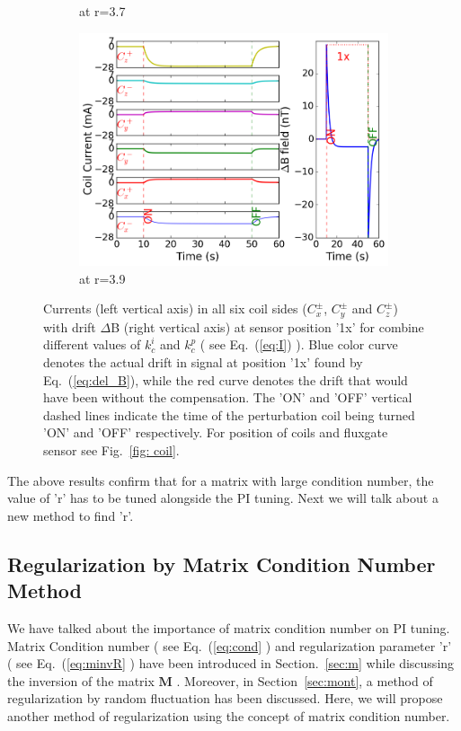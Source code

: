 \begin{figure}[!htb]
\begin{subfigure}{.5\linewidth}
        \caption{at r=3.7}
        \label{fig:r37}
    \end{subfigure}%
        \begin{subfigure}{.5\linewidth}
        \centering
        \includegraphics[width=\linewidth, height= 6.5 cm]{Images/r39}
        \caption{at r=3.9}
        \label{fig:r39}
    \end{subfigure}


    \caption{Currents (left vertical axis) in all six coil sides ($C_x^\pm$, $C_y^\pm$ and $C_z^\pm$) with drift $\Delta$B (right vertical axis) at sensor position '1x' for combine different values of $k_c^i$ and $k_c^p$ ( see Eq.~(\ref{eq:I}) ). Blue color curve denotes the actual drift in signal at position '1x' found by Eq.~(\ref{eq:del_B}), while the red curve denotes the drift that would have been without the compensation. The 'ON' and 'OFF' vertical dashed lines indicate the time of the perturbation coil being turned 'ON' and 'OFF' respectively. For position of coils and fluxgate sensor see Fig.~\ref{fig: coil}.}
    \label{fig:r_pi_more}
\end{figure}

\FloatBarrier

The above results confirm that for a matrix with large condition number, the value of 'r' has to be tuned alongside the PI tuning. Next we will talk about a new method to find 'r'.

\subsection{Regularization by Matrix Condition Number Method  }\label{sec:cond}
We have talked about the importance of matrix condition number on PI tuning. Matrix Condition number ( see Eq.~(\ref{eq:cond} ) and regularization parameter 'r' ( see Eq.~(\ref{eq:minvR} ) have been introduced in Section.~\ref{sec:m} while discussing the inversion of the matrix $\bm{M}$ . Moreover, in Section~\ref{sec:mont}, a method of regularization by random fluctuation has been discussed. Here, we will propose another method of regularization using the concept of matrix condition number.
 
